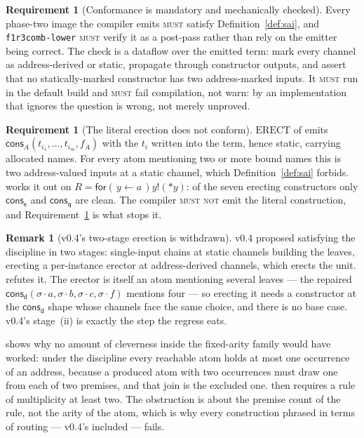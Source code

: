 \documentclass[11pt,a4paper]{article}
\newcommand{\code}[1]{\texttt{#1}}
\newcommand{\MUST}{\textsc{must}}
\newcommand{\MUSTNOT}{\textsc{must not}}
\newcommand{\drp}[1]{{*}#1}
\newcommand{\inp}[3]{\mathsf{for}(\,#1 \leftarrow #2\,)#3}
\newcommand{\out}[2]{#1!(#2)}
\newcommand{\dd}{\mathsf{d}}
\newcommand{\ev}{\mathsf{e}}
\newcommand{\qq}{\mathsf{q}}
\newcommand{\cons}{\mathsf{cons}}
\newcommand{\ERECT}{\mathrm{ERECT}}
\theoremstyle{definition}
\newtheorem{requirement}[definition]{Requirement}
\newtheorem{remark}[definition]{Remark}
\theoremstyle{plain}
\begin{document}
\begin{requirement}[Conformance is mandatory and mechanically checked]
\label{req:sai}
Every phase-two image the compiler emits \MUST{} satisfy
Definition~\ref{def:sai}, and \code{f1r3comb-lower} \MUST{} verify it as a
post-pass rather than rely on the emitter being correct. The check is a
dataflow over the emitted term: mark every channel as address-derived or
static, propagate through constructor outputs, and assert that no
statically-marked constructor has two address-marked inputs. It \MUST{} run in
the default build and \MUST{} fail compilation, not warn: by
\cite[Rem.~6.12]{draft3} an implementation that ignores the question is wrong,
not merely unproved.
\end{requirement}

\begin{requirement}[The literal erection does not conform]
\label{req:erectviolates}
$\ERECT$ of \cite[Def.~6.8]{draft3} emits
$\cons_{A}(t_{i_{1}},\dots,t_{i_{m}},f_{A})$ with the $t_{i}$ written into the
term, hence static, carrying allocated names. For every atom mentioning two or
more bound names this is two address-valued inputs at a static channel, which
Definition~\ref{def:sai} forbids. \cite[Ex.~6.16]{draft3} works it out on
$R = \inp{y}{a}{\out{y}{\drp{y}}}$: of the seven erecting constructors only
$\cons_{\ev}$ and $\cons_{\qq}$ are clean. The compiler \MUSTNOT{} emit the
literal construction, and Requirement~\ref{req:sai} is what stops it.
\end{requirement}

\begin{remark}[v0.4's two-stage erection is withdrawn]\label{rem:twostagegone}
v0.4 proposed satisfying the discipline in two stages: single-input chains at
static channels building the leaves, erecting a per-instance erector at
address-derived channels, which erects the unit. \cite[\S6.6]{draft3} refutes
it. The erector is itself an atom mentioning several leaves --- the repaired
$\cons_{\dd}(\sigma\!\cdot\!a,\sigma\!\cdot\!b,\sigma\!\cdot\!c,
\sigma\!\cdot\!f)$ mentions four --- so erecting it needs a constructor at the
$\cons_{\dd}$ shape whose channels face the same choice, and there is no base
case. v0.4's stage~(ii) is exactly the step the regress eats.

\cite[Prop.~6.17]{draft3} shows why no amount of cleverness inside the
fixed-arity family would have worked: under the discipline every reachable
atom holds at most one occurrence of an address, because a produced atom with
two occurrences must draw one from each of two premises, and that join is the
excluded one. \cite[Lem.~6.19]{draft3} then requires a rule of multiplicity at
least two. The obstruction is about the premise count of the rule, not the
arity of the atom, which is why every construction phrased in terms of routing
--- v0.4's included --- fails.
\end{remark}
\end{document}
